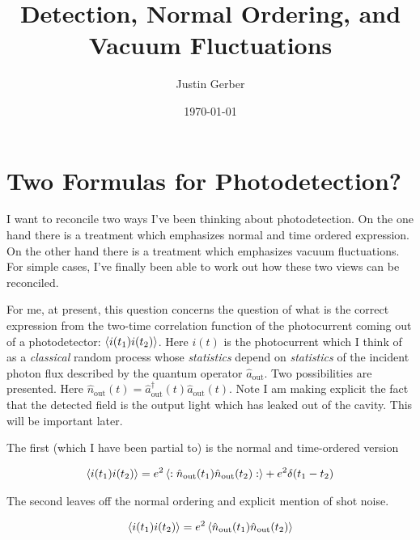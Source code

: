 \documentclass[12pt]{article}
\begin{document}
\title{Detection, Normal Ordering, and Vacuum Fluctuations}
\author{Justin Gerber}
\date{\today}
\maketitle

\section{Two Formulas for Photodetection?}

I want to reconcile two ways I've been thinking about photodetection. On the one hand there is a treatment which emphasizes normal and time ordered expression. On the other hand there is a treatment which emphasizes vacuum fluctuations. For simple cases, I've finally been able to work out how these two views can be reconciled.

For me, at present, this question concerns the question of what is the correct expression from the two-time correlation function of the photocurrent coming out of a photodetector: $\Braket{i(t_1)i(t_2)}$. Here $i(t)$ is the photocurrent which I think of as a \textit{classical} random process whose \textit{statistics} depend on \textit{statistics} of the incident photon flux described by the quantum operator $\hat{a}_{\text{out}}$. Two possibilities are presented. Here $\hat{n}_{\text{out}}(t) = \hat{a}_{\text{out}}^{\dag}(t) \hat{a}_{\text{out}}(t)$. Note I am making explicit the fact that the detected field is the output light which has leaked out of the cavity. This will be important later.

The first (which I have been partial to) is the normal and time-ordered version

\begin{align}
\Braket{i(t_1)i(t_2)} = e^2 \Braket{:\hat{n}_{\text{out}}(t_1) \hat{n}_{\text{out}}(t_2):} + e^2 \delta(t_1-t_2)
\end{align}

The second leaves off the normal ordering and explicit mention of shot noise.

\begin{align}
\Braket{i(t_1)i(t_2)} = e^2 \Braket{\hat{n}_{\text{out}}(t_1) \hat{n}_{\text{out}}(t_2)}
\end{align}
\end{document}
